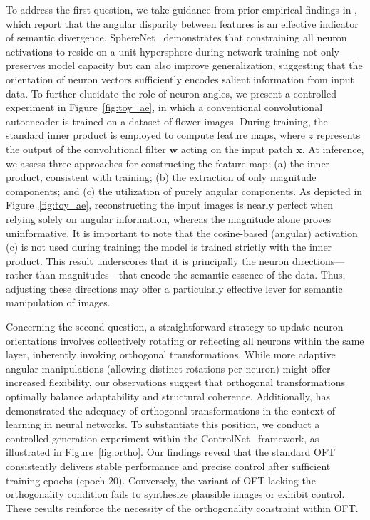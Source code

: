 To address the first question, we take guidance from prior empirical findings in \cite{liu2018decoupled,chen2020angular}, which report that the angular disparity between features is an effective indicator of semantic divergence. SphereNet~\cite{liu2017deep} demonstrates that constraining all neuron activations to reside on a unit hypersphere during network training not only preserves model capacity but can also improve generalization, suggesting that the orientation of neuron vectors sufficiently encodes salient information from input data. To further elucidate the role of neuron angles, we present a controlled experiment in Figure~\ref{fig:toy_ae}, in which a conventional convolutional autoencoder is trained on a dataset of flower images. During training, the standard inner product is employed to compute feature maps, where $z$ represents the output of the convolutional filter $\bm{w}$ acting on the input patch $\bm{x}$. At inference, we assess three approaches for constructing the feature map: (a) the inner product, consistent with training; (b) the extraction of only magnitude components; and (c) the utilization of purely angular components. As depicted in Figure~\ref{fig:toy_ae}, reconstructing the input images is nearly perfect when relying solely on angular information, whereas the magnitude alone proves uninformative. It is important to note that the cosine-based (angular) activation (c) is not used during training; the model is trained strictly with the inner product. This result underscores that it is principally the neuron directions—rather than magnitudes—that encode the semantic essence of the data. Thus, adjusting these directions may offer a particularly effective lever for semantic manipulation of images.

Concerning the second question, a straightforward strategy to update neuron orientations involves collectively rotating or reflecting all neurons within the same layer, inherently invoking orthogonal transformations. While more adaptive angular manipulations (allowing distinct rotations per neuron) might offer increased flexibility, our observations suggest that orthogonal transformations optimally balance adaptability and structural coherence. Additionally, \cite{liu2021orthogonal} has demonstrated the adequacy of orthogonal transformations in the context of learning in neural networks. To substantiate this position, we conduct a controlled generation experiment within the ControlNet~\cite{zhang2023adding} framework, as illustrated in Figure~\ref{fig:ortho}. Our findings reveal that the standard OFT consistently delivers stable performance and precise control after sufficient training epochs (epoch 20). Conversely, the variant of OFT lacking the orthogonality condition fails to synthesize plausible images or exhibit control. These results reinforce the necessity of the orthogonality constraint within OFT.


